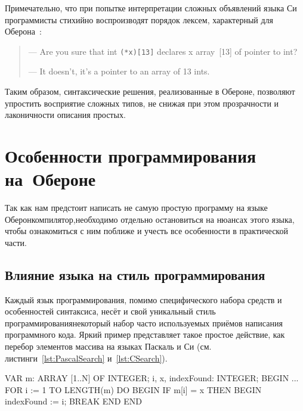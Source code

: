 \documentclass[utf8]{lgu}
\newcommand{\tire}{\unskip\nobreak\thinspace\textemdash\thinspace}
\newcommand{\code}[1]{{\normalsize\texttt{#1}}}
\begin{document}
Примечательно, что при попытке интерпретации сложных объявлений языка Си программисты стихийно воспроизводят порядок лексем, характерный для Оберона~\cite{CDeclarations}:

\begin{quote}
--- Are you sure that int \code{(*x)[13]} declares x array~[13] of pointer to int?

--- It doesn't, it's a pointer to an array of 13 ints.
\end{quote}

Таким образом, синтаксические решения, реализованные в Обероне, позволяют упростить восприятие сложных типов, не снижая при этом прозрачности и лаконичности описания простых.

\section{Особенности программирования на~Обероне}

\firstparskip Так как нам предстоит написать не самую простую программу на языке Оберон\tire компи\-лятор,\tire необходимо отдельно остановиться на нюансах этого языка, чтобы ознакомиться с ним поближе и учесть все особенности в практической части.

\subsection{Влияние языка на стиль программирования}

\firstparskip Каждый язык программирования, помимо специфического набора средств и особенностей синтаксиса, несёт и свой уникальный стиль программирования\tire некоторый набор часто используемых приёмов написания программного кода. Яркий пример представляет такое простое действие, как перебор элементов массива на языках Паскаль и Си (см. листинги~\ref{lst:PascalSearch} и~\ref{lst:CSearch}).

\begin{listing}[H]
\caption{Пример реализации алгоритма поиска на языке Паскаль}
\label{lst:PascalSearch}
\vspace{-17pt}
\begin{pascal}
VAR
  m: ARRAY [1..N] OF INTEGER;
  i, x, indexFound: INTEGER;
BEGIN
  { ... }
  FOR i := 1 TO LENGTH(m) DO BEGIN
    IF m[i] = x THEN BEGIN
      indexFound := i;
      BREAK
    END
  END
\end{pascal}
\end{listing}
\end{document}
